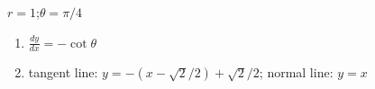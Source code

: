{$r=1$;\quad $\theta = \pi/4$}
{\begin{enumerate}
	\item $\frac{dy}{dx} = -\cot\theta$
	\item	tangent line: $y=-(x-\sqrt{2}/2)+\sqrt{2}/2$; normal line: $y=x$
\end{enumerate}}
